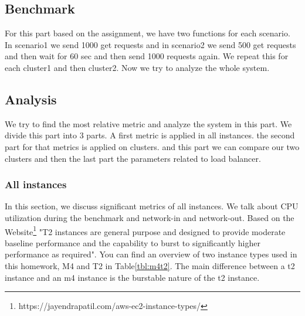 \documentclass[12pt]{article}
\begin{document}
        \subsection{Benchmark}
         For this part based on the assignment, we have two functions for each scenario. In scenario1 we send 1000 get requests and in scenario2 we send 500 get requests and then wait for 60 sec and then send 1000 requests again. We repeat this for each cluster1 and then cluster2. Now we try to analyze the whole system. 

         \subsection{Analysis}
            We try to find the most relative metric and analyze the system in this part. We divide this part into 3 parts. A first metric is applied in all instances. the second part for that metrics is applied on clusters. and this part we can compare our two clusters and then the last part the parameters related to load balancer.

        

        \subsubsection{All instances}
        In this section, we discuss significant metrics of all instances. We talk about CPU utilization during the benchmark and network-in and network-out. 
         Based on the Website\footnote{https://jayendrapatil.com/aws-ec2-instance-types/} "T2 instances are general purpose and designed to provide moderate baseline performance and the capability to burst to significantly higher performance as required". You can find an overview of two instance types used in this homework, M4 and T2 in Table\ref{tbl:m4t2}. The main difference between a t2 instance and an m4 instance is the burstable nature of the t2 instance.\\
        
\end{document}
